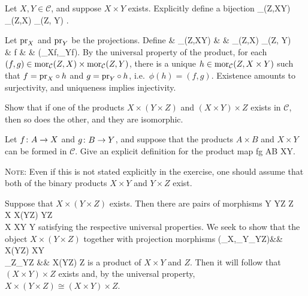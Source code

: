 \bx
Let $X,Y\in\mathcal{C}$, and suppose $X\times Y$ exists. Explicitly define a bijection
\bse
\mor_{}(Z,X\times Y) \xrightarrow{\ \cong\ }\mor_{}(Z,X) \times \mor_{}(Z, Y) .
\ese
\ex

\bs
Let $\mathrm{pr}_X$ and $\mathrm{pr}_Y$ be the projections. Define
\phi\cl & \mor_{}(Z,X\times Y) & \to & \mor_{}(Z,X) \times \mor_{}(Z, Y) \\
& f & \mapsto & (\pr_X\circ f,\pr_Y\circ f).
\ei
By the universal property of the product, for each $(f,g)\in \operatorname{mor}_{\mathcal{C}}(Z,X) \times \operatorname{mor}_{\mathcal{C}}(Z, Y)$, there is a unique $h\in\operatorname{mor}_{\mathcal{C}}(Z,X\times Y)$ such that $f=\mathrm{pr}_X\circ h$ and $g=\mathrm{pr}_Y\circ h$, i.e.\ $\phi(h)=(f,g)$. Existence amounts to surjectivity, and uniqueness implies injectivity.
\es

\bx
\ben[label=(\alph*)]
\item Show that if one of the products $X\times(Y\times Z)$ and $(X\times Y)\times Z$ exists in $\mathcal{C}$, then so does the other, and they are isomorphic.
\item Let $f\colon A\to X$ and $g\colon B\to Y$, and suppose that the products $A\times B$ and $X\times Y$ can be formed in $\mathcal{C}$. Give an explicit definition for the product map
\bse
f\times g \cl A\times B \to X\times Y.
\ese
\een
\ex

\bs
{\scshape Note}: Even if this is not stated explicitly in the exercise, one should assume that both of the binary products $X\times Y$ and $Y\times Z$ exist. 
\ben[label=(\alph*)]
\item Suppose that $X\times(Y\times Z)$ exists. Then there are pairs of morphisms
Y  Y\times Z  Z\\
X  X\times (Y\times Z)  Y\times Z\\
X  X\times Y  Y
\ei
satisfying the respective universal properties. We seek to show that the object $X\times(Y\times Z)$ together with projection morphisms
(\pr_X,\pr_Y\circ\pr_{Y\times Z})\cl && X\times(Y\times Z) \longrightarrow X\times Y\\ 
\pr_Z\circ\pr_{Y\times Z} \cl &&  X\times(Y\times Z) \longrightarrow Z
\ei
is a product of $X\times Y$ and $Z$. Then it will follow that $(X\times Y)\times Z$ exists and, by the universal property, $X\times (Y\times Z)\cong (X\times Y)\times Z$.


